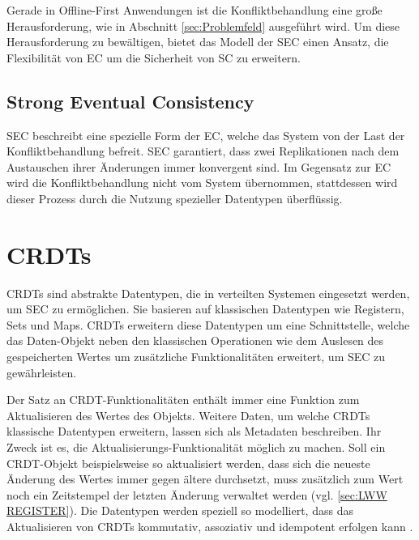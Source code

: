 \documentclass[a4paper, 12pt]{scrreprt}
\begin{document}
Gerade in Offline-First Anwendungen ist die Konfliktbehandlung eine große Herausforderung, wie in Abschnitt \ref{sec:Problemfeld} ausgeführt wird. Um diese Herausforderung zu bewältigen, bietet das Modell der \acf{SEC} einen Ansatz, die Flexibilität von \ac{EC} um die Sicherheit von \ac{SC} zu erweitern. 




\subsection{Strong Eventual Consistency}


\ac{SEC} beschreibt eine spezielle Form der \acf{EC}, welche das System von der Last der Konfliktbehandlung befreit. \ac{SEC} garantiert, dass zwei Replikationen nach dem Austauschen ihrer Änderungen immer konvergent sind. Im Gegensatz zur \ac{EC} wird die Konfliktbehandlung nicht vom System übernommen, stattdessen wird dieser Prozess durch die Nutzung spezieller Datentypen überflüssig. 


\section{CRDTs}
\label{sec:crdts}

CRDTs sind abstrakte Datentypen, die in verteilten Systemen eingesetzt werden, um \ac{SEC} zu ermöglichen. Sie basieren auf klassischen Datentypen wie Registern, Sets und Maps. CRDTs erweitern diese Datentypen um eine Schnittstelle, welche das Daten-Objekt neben den klassischen Operationen wie dem Auslesen des gespeicherten Wertes um zusätzliche Funktionalitäten erweitert, um \ac{SEC} zu gewährleisten.\autocite[S.1 ]{ArticleCRDTOverview}

Der Satz an CRDT-Funktionalitäten enthält immer eine Funktion zum Aktualisieren des Wertes des Objekts. Weitere Daten, um welche CRDTs klassische Datentypen erweitern, lassen sich als Metadaten beschreiben. Ihr Zweck ist es, die Aktualisierungs-Funktionalität möglich zu machen. Soll ein CRDT-Objekt beispielsweise so aktualisiert werden, dass sich die neueste Änderung des Wertes immer gegen ältere durchsetzt, muss zusätzlich zum Wert noch ein Zeitstempel der letzten Änderung verwaltet werden (vgl. \ref{sec:LWW REGISTER}).
Die Datentypen werden speziell so modelliert, dass das Aktualisieren von CRDTs kommutativ, assoziativ und idempotent erfolgen kann \autocite{InproceedingsCrdtsInProduction}.
\end{document}
